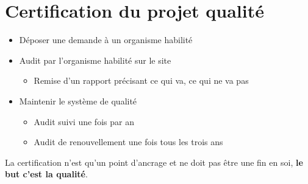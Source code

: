 \section{Certification du projet qualité}
\begin{itemize}
	\item Déposer une demande à un organisme habilité
	\item Audit par l’organisme habilité sur le site
	\begin{itemize}
		\item Remise d’un rapport précisant ce qui va, ce qui ne va pas
	\end{itemize}
	\item Maintenir le système de qualité
	\begin{itemize}
		\item Audit suivi une fois par an
		\item Audit de renouvellement une fois tous les trois ans
	\end{itemize}
\end{itemize}

La certification n’est qu’un point d’ancrage et ne doit pas être une fin en soi, \textbf{le but c’est la qualité}.
